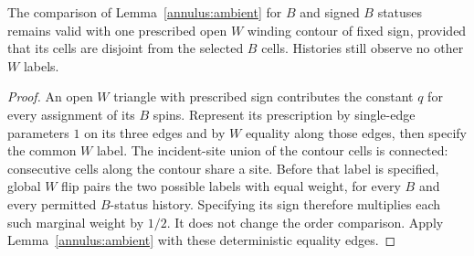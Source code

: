 \begin{lemma}\label{annulus:one-white}
The comparison of Lemma~\ref{annulus:ambient} for $B$ and signed
$B$ statuses remains valid with one prescribed open $W$ winding contour
of fixed sign, provided that its cells are disjoint from the selected
$B$ cells. Histories still observe no other $W$ labels.
\end{lemma}
\begin{proof}
An open $W$ triangle with prescribed sign contributes the constant $q$
for every assignment of its $B$ spins. Represent its prescription by
single-edge parameters $1$ on its three edges and by $W$ equality along
those edges, then specify the common $W$ label. The incident-site union
of the contour cells is connected: consecutive cells along the contour
share a site. Before that label is specified, global $W$ flip pairs the
two possible labels with equal weight, for every $B$ and every permitted
$B$-status history. Specifying its sign therefore multiplies each such
marginal weight by $1/2$. It does not change the order comparison.
Apply Lemma~\ref{annulus:ambient} with these deterministic equality edges.
\end{proof}

